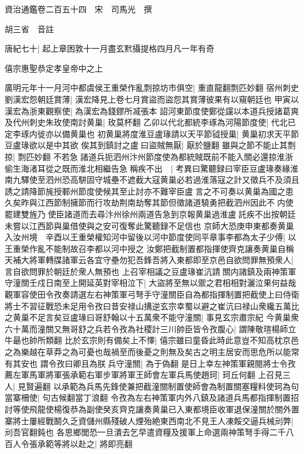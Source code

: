 資治通鑑卷二百五十四　宋　司馬光　撰

胡三省　音註

唐紀七十|{
	起上章困敦十一月盡玄黓攝提格四月凡一年有奇}


僖宗惠聖恭定孝皇帝中之上

廣明元年十一月河中都虞侯王重榮作亂剽掠坊市俱空|{
	重直龍翻剽匹妙翻}
宿州刺史劉漢宏怨朝廷賞薄|{
	漢宏降見上卷七月賞盜而盜怨其賞薄彼果有以窺朝廷也}
甲寅以漢宏為浙東觀察使|{
	為漢宏為錢鏐所㓕張本}
詔河東節度使鄭從讜以本道兵授諸葛爽及代州刺史朱玫使南討黄巢|{
	玫莫杯翻}
乙卯以代北都統李琢為河陽節度使|{
	代北已定李琢内徙亦以備黄巢也}
初黄巢將度淮豆盧瑑請以天平節钺授巢|{
	黄巢初求天平節豆盧瑑欲以是中其欲}
俟其到鎮討之盧曰盜賊無厭|{
	厭於鹽翻}
雖與之節不能止其剽掠|{
	剽匹妙翻}
不若急諸道兵扼泗州汴州節度使為都統賊既前不能入關必還掠淮浙偷生海渚耳從之既而淮北相繼告急稱疾不出　|{
	考異曰驚聽録曰宰臣豆盧瑑奏緣淮南九驛使至泗州恐高駢固守城壘不遮截大寇黄巢必若過淮落寇之計又徵兵不及須且誘之請降節旄授鄆州節度使候其至止討亦不難宰臣盧言之不可奏以黄巢為國之患久矣昨與江西節制擁節而行攻劫荆南劫奪其節但徵諸道驍勇把截泗州因此不内使罷建雙旌乃使臣諸道而去尋汴州徐州兩道告急到京報黄巢過淮盧託疾不出按朝廷未嘗以江西節與巢借使與之安可復奪此驚聽録不足信也}
京師大恐庚申東都奏黄巢入汝州境　辛酉以王重榮權知河中留後以河中節度使同平章事李都為太子少傅|{
	以王重榮作亂不能制故召李都以河中授之}
汝鄭把截制置都指揮使齊克讓奏黄巢自稱天補大將軍轉牒諸軍云各宜守壘勿犯吾鋒吾將入東都即至京邑自欲問罪無預衆人|{
	言自欲問罪於朝廷於衆人無預也}
上召宰相議之豆盧瑑崔沆請關内諸鎮及兩神策軍守潼關壬戍日南至上開延英對宰相泣下|{
	大盜將至無以禦之君相相對灑泣果何益哉}
觀軍容使田令孜奏請選左右神策軍弓弩手守潼關臣自為都指揮制置把截使上曰侍衛將士不習征戰恐未足用令孜曰昔安禄山搆逆玄宗幸蜀以避之崔沆曰禄山衆纔五萬比之黄巢不足言矣豆盧瑑曰哥舒翰以十五萬衆不能守潼關|{
	事見玄宗肅宗紀}
今黄巢衆六十萬而潼關又無哥舒之兵若令孜為社稷計三川帥臣皆令孜腹心|{
	謂陳敬瑄楊師立牛朂也帥所類翻}
比於玄宗則有備矣上不懌|{
	僖宗雖曰童昏此時此意豈不知高枕京邑之為樂越在草莽之為可憂也哉禍至而後憂之則無及矣古之明主居安而思危所以能常有其安也}
謂令孜曰卿且為朕兵守潼關|{
	為于偽翻}
是日上幸左神策軍親閱將士令孜薦左軍馬軍將軍張承範右軍步軍將軍王師會左軍兵馬使趙珂|{
	珂丘何翻}
上召見三人|{
	見賢遍翻}
以承範為兵馬先鋒使兼把截潼關制置使師會為制置關塞糧料使珂為句當寨柵使|{
	句古候翻當丁浪翻}
令孜為左右神策軍内外八鎮及諸道兵馬都指揮制置招討等使飛龍使楊復恭為副使癸亥齊克讓奏黄巢已入東都境臣收軍退保潼關於關外置寨將士屢經戰鬭久乏資儲州縣殘破人煙殆絶東西南北不見王人凍餒交逼兵械刓弊|{
	刓吾官翻鈍也}
各思鄉閭恐一旦潰去乞早遣資糧及援軍上命選兩神策弩手得二千八百人令張承範等將以赴之|{
	將即亮翻}
